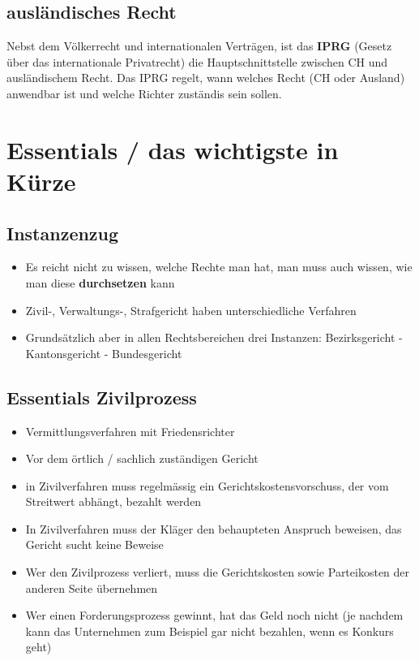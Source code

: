 \documentclass{report}
\theoremstyle{definition}
\theoremstyle{example}
\begin{document}
\subsection{ausländisches Recht}
Nebst dem Völkerrecht und internationalen Verträgen, ist das \textbf{IPRG} (Gesetz über das internationale Privatrecht) die Hauptschnittstelle zwischen CH und ausländischem Recht.
Das IPRG regelt, wann welches Recht (CH oder Ausland) anwendbar ist und welche Richter zuständis sein sollen.

\section{Essentials / das wichtigste in Kürze}

\subsection{Instanzenzug}
\begin{itemize}
   \item Es reicht nicht zu wissen, welche Rechte man hat, man muss auch wissen, wie man diese \textbf{durchsetzen} kann
   \item Zivil-, Verwaltungs-, Strafgericht haben unterschiedliche Verfahren
   \item Grundsätzlich aber in allen Rechtsbereichen drei Instanzen: Bezirksgericht - Kantonsgericht - Bundesgericht
\end{itemize}

\subsection{Essentials Zivilprozess}
\begin{itemize}
   \item Vermittlungsverfahren mit Friedensrichter
   \item Vor dem örtlich / sachlich zuständigen Gericht
   \item in Zivilverfahren muss regelmässig ein Gerichtskostensvorschuss, der vom Streitwert abhängt, bezahlt werden
   \item In Zivilverfahren muss der Kläger den behaupteten Anspruch beweisen, das Gericht sucht keine Beweise
   \item Wer den Zivilprozess verliert, muss die Gerichtskosten sowie Parteikosten der anderen Seite übernehmen
   \item Wer einen Forderungsprozess gewinnt, hat das Geld noch nicht (je nachdem kann das Unternehmen zum Beispiel gar nicht bezahlen, wenn es Konkurs geht)
\end{itemize}
\end{document}
